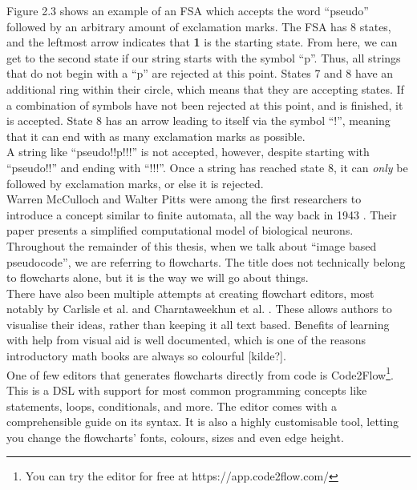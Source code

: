 Figure 2.3 shows an example of an FSA which accepts the word ``pseudo'' followed by an arbitrary amount of exclamation marks. The FSA has 8 states, and the leftmost arrow indicates that \textbf{1} is the starting state. From here, we can get to the second state if our string starts with the symbol ``p''. Thus, all strings that do not begin with a ``p'' are rejected at this point. States 7 and 8 have an additional ring within their circle, which means that they are accepting states. If a combination of symbols have not been rejected at this point, and is finished, it is accepted. State 8 has an arrow leading to itself via the symbol ``!'', meaning that it can end with as many exclamation marks as possible. \hfill \\

A string like ``pseudo!!p!!!'' is not accepted, however, despite starting with ``pseudo!!'' and ending with ``!!!''. Once a string has reached state 8, it can \textit{only} be followed by exclamation marks, or else it is rejected. \hfill \\

Warren McCulloch and Walter Pitts were among the first researchers to introduce a concept similar to finite automata, all the way back in 1943 \cite{McCulloch43}. Their paper presents a simplified computational model of biological neurons. \hfill \\

Throughout the remainder of this thesis, when we talk about ``image based pseudocode'', we are referring to flowcharts. The title does not technically belong to flowcharts alone, but it is the way we will go about things. \hfill \\

There have also been multiple attempts at creating flowchart editors, most notably by Carlisle et al. and Charntaweekhun et al. \cite{carlisle2004}\cite{charntaweekhun2006}. These allows authors to visualise their ideas, rather than keeping it all text based. Benefits of learning with help from visual aid is well documented, which is one of the reasons introductory math books are always so colourful [kilde?]. \hfill \\ %

One of few editors that generates flowcharts directly from code is Code2Flow\footnote{You can try the editor for free at https://app.code2flow.com/}. This is a DSL with support for most common programming concepts like statements, loops, conditionals, and more. The editor comes with a comprehensible guide on its syntax. It is also a highly customisable tool, letting you change the flowcharts' fonts, colours, sizes and even edge height. \hfill \\

